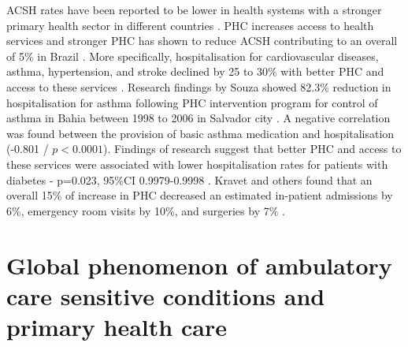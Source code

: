 ACSH rates have been reported to be lower in health systems with a stronger primary health sector in different countries \cite{rosano2012relationship}. PHC increases access to health services and stronger PHC has shown to reduce ACSH contributing to an overall of 5\% in Brazil \cite{macinko2011influence}. More specifically, hospitalisation for cardiovascular diseases, asthma, hypertension, and stroke declined by 25 to 30\% with better PHC and access to these services \cite{macinko2010major}.  Research findings by Souza showed 82.3\% reduction in hospitalisation for asthma following PHC intervention program for control of asthma in Bahia between 1998 to 2006 in Salvador city \cite{souza2010rapid}. A negative correlation was found between the provision of basic asthma medication and hospitalisation (-0.801 / $p<0.0001$). Findings of research suggest that better PHC and access to these services were associated with lower hospitalisation rates for patients with diabetes - p=0.023, 95\%CI 0.9979-0.9998 \cite{calderon2014does}. Kravet and others found that an overall 15\% of increase in PHC decreased an estimated in-patient admissions by 6\%, emergency room visits by 10\%, and surgeries by 7\% \cite{kravet2008health}.

\section{Global phenomenon of ambulatory care sensitive conditions and primary health care}

